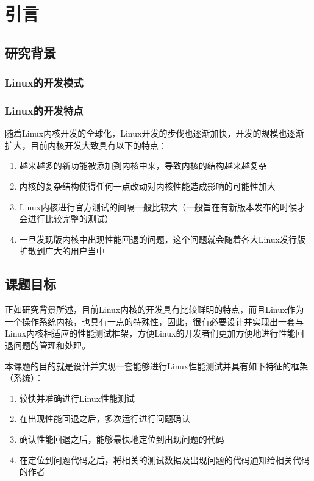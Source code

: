 
\chapter{引言}


\section{研究背景}

\subsection{Linux的开发模式}


\subsection{Linux的开发特点}
随着Linux内核开发的全球化，Linux开发的步伐也逐渐加快，开发的规模也逐渐扩大，目前内核开发大致具有以下的特点：

\begin{enumerate}
\item 越来越多的新功能被添加到内核中来，导致内核的结构越来越复杂
\item 内核的复杂结构使得任何一点改动对内核性能造成影响的可能性加大
\item Linux内核进行官方测试的间隔一般比较大（一般旨在有新版本发布的时候才会进行比较完整的测试）
\item 一旦发现版内核中出现性能回退的问题，这个问题就会随着各大Linux发行版扩散到广大的用户当中
\end{enumerate}

\section{课题目标}

正如研究背景所述，目前Linux内核的开发具有比较鲜明的特点，而且Linux作为一个操作系统内核，也具有一点的特殊性，因此，很有必要设计并实现出一套与Linux内核相适应的性能测试框架，方便Linux的开发者们更加方便地进行性能回退问题的管理和处理。

本课题的目的就是设计并实现一套能够进行Linux性能测试并具有如下特征的框架（系统）：

\begin{enumerate}
\item 较快并准确进行Linux性能测试
\item 在出现性能回退之后，多次运行进行问题确认
\item 确认性能回退之后，能够最快地定位到出现问题的代码
\item 在定位到问题代码之后，将相关的测试数据及出现问题的代码通知给相关代码的作者
\end{enumerate}